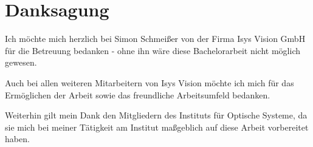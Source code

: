 \thispagestyle{plain}
\chapter*{Danksagung}

Ich möchte mich herzlich bei Simon Schmeißer von der Firma Isys Vision GmbH für die Betreuung bedanken - ohne ihn wäre diese Bachelorarbeit nicht möglich gewesen.

Auch bei allen weiteren Mitarbeitern von Isys Vision möchte ich mich für das Ermöglichen der Arbeit sowie das freundliche Arbeitsumfeld bedanken.

Weiterhin gilt mein Dank den Mitgliedern des Instituts für Optische Systeme, da sie mich bei meiner Tätigkeit am Institut maßgeblich auf diese Arbeit vorbereitet haben.
